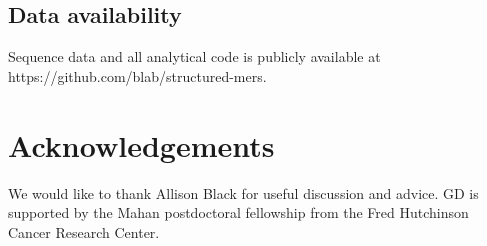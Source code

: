 \documentclass[11pt,oneside,letterpaper]{article}
\begin{document}
\subsection*{Data availability}
Sequence data and all analytical code is publicly available at https://github.com/blab/structured-mers.

\section*{Acknowledgements}
We would like to thank Allison Black for useful discussion and advice.
GD is supported by the Mahan postdoctoral fellowship from the Fred Hutchinson Cancer Research Center.





\newpage

\setcounter{figure}{0}
\setcounter{table}{0}
\renewcommand{\thefigure}{S\arabic{figure}}
\renewcommand{\thetable}{S\arabic{table}}
\end{document}
